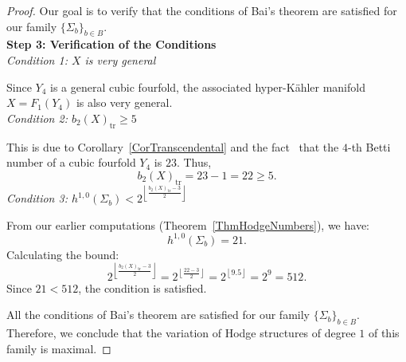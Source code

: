 \documentclass{article}
\theoremstyle{definition}
\begin{document}
\begin{proof}
Our goal is to verify that the conditions of Bai's theorem are satisfied for our family $\{\Sigma_b\}_{b \in B}$.\\
\textbf{Step 3: Verification of the Conditions}\\
\emph{Condition 1: $X$ is very general}

Since $Y_4$ is a general cubic fourfold, the associated hyper-Kähler manifold $X = F_1(Y_4)$ is also very general.\\
\emph{Condition 2: $b_2(X)_{\mathrm{tr}} \geq 5$}

This is due to Corollary~\ref{CorTranscendental} and the fact~\cite[Corollary 2.12]{HuybrechtsCubic} that the $4$-th Betti number of a cubic fourfold $Y_4$ is $23$. 
Thus,
\[
b_2(X)_{\mathrm{tr}} = 23 - 1 = 22 \geq 5.
\]
\emph{Condition 3: $h^{1, 0}(\Sigma_b) < 2^{\left\lfloor \frac{b_2(X)_{\mathrm{tr}} - 3}{2} \right\rfloor}$}

From our earlier computations (Theorem~\ref{ThmHodgeNumbers}), we have:
\[
h^{1, 0}(\Sigma_b) = 21.
\]
Calculating the bound:
\[
2^{\left\lfloor \frac{b_2(X)_{\mathrm{tr}} - 3}{2} \right\rfloor} = 2^{\left\lfloor \frac{22 - 3}{2} \right\rfloor} = 2^{\left\lfloor 9.5 \right\rfloor} = 2^9 = 512.
\]
Since $21 < 512$, the condition is satisfied.

All the conditions of Bai's theorem are satisfied for our family $\{\Sigma_b\}_{b \in B}$. Therefore, we conclude that the variation of Hodge structures of degree $1$ of this family is maximal.

\end{proof}
\end{document}

